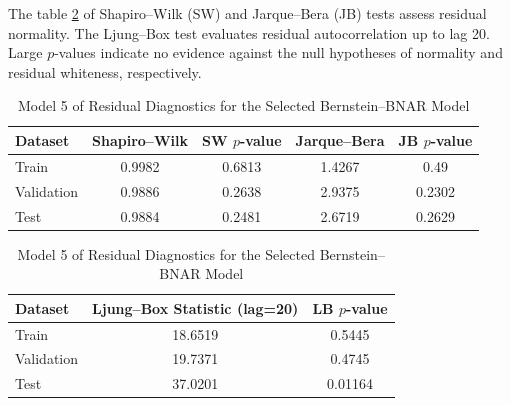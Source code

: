 \documentclass{article}
\begin{document}
The table \ref{tab:model5-residual_diagnostics} of Shapiro--Wilk (SW) and Jarque--Bera (JB) tests assess residual normality. The Ljung--Box test evaluates residual autocorrelation up to lag 20. Large $p$-values indicate no evidence against the null hypotheses of normality and residual whiteness, respectively.
\begin{table}[htbp]
\centering
\caption{Model 5 of Residual Diagnostics for the Selected Bernstein--BNAR Model}
\label{tab:model5-residual_diagnostics}
\begin{tabular}{lcccc}
\hline
\textbf{Dataset} 
& \textbf{Shapiro--Wilk} 
& \textbf{SW $p$-value} 
& \textbf{Jarque--Bera} 
& \textbf{JB $p$-value} \\
\hline
Train       & 0.9982 & 0.6813 & 1.4267 & 0.49 \\
Validation  & 0.9886 & 0.2638 & 2.9375 & 0.2302 \\
Test        & 0.9884 & 0.2481 & 2.6719 & 0.2629 \\
\hline
\end{tabular}

\vspace{0.6em}

\begin{tabular}{lcc}
\hline
\textbf{Dataset} 
& \textbf{Ljung--Box Statistic (lag=20)} 
& \textbf{LB $p$-value} \\
\hline
Train       & 18.6519 & 0.5445 \\
Validation  & 19.7371 & 0.4745 \\
Test        & 37.0201 & 0.01164 \\
\hline
\end{tabular}

\vspace{0.6em}
\end{table}
\end{document}
